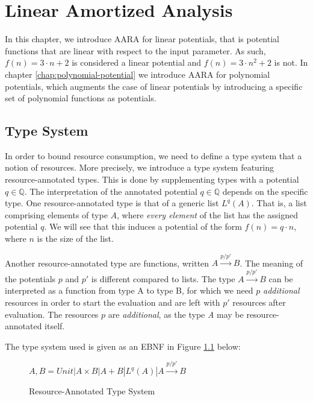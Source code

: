 \chapter{Linear Amortized Analysis} \label{chap:linear}

In this chapter, we introduce AARA for linear potentials, that is potential functions that are linear with respect to the input parameter. As such, \(f(n) = 3 \cdot n + 2\) is considered a linear potential and \(f(n) = 3 \cdot n^{2} + 2\) is not. 
In chapter \ref{chap:polynomial-potential} we introduce AARA for polynomial potentials, which augments the case of linear potentials by introducing a specific set of polynomial functions as potentials.

\section{Type System} \label{chap:type-system}
In order to bound resource consumption, we need to define a type system that a notion of resources. More precisely, we introduce a type system featuring resource-annotated types. This is done by supplementing types with a potential \(q \in \mathbb{Q}\). The interpretation of the annotated potential $ q \in \mathbb{Q} $ depends on the specific type.
One resource-annotated type is that of a generic list \(L^q(A)\). That is, a list comprising elements of type \(A\), where \emph{every element} of the list has the assigned potential \(q\).
We will see that this induces a potential of the form \(f(n) = q \cdot n\), where \(n\) is the size of the list. 

Another resource-annotated type are functions, written \(A \xrightarrow{p/p'} B\). The meaning of the potentials \(p\) and \(p'\) is different compared to lists. The type \(A \xrightarrow{p/p'} B\) can be interpreted as a function from type A to type B, for which we need \(p\) \emph{additional} resources in order to start the evaluation and are left with \(p'\) resources after evaluation. The resources \(p\) are \emph{additional}, as the type \emph{A} may be resource-annotated itself.

The type system used is given as an EBNF in Figure \ref{fig:type-system} below:

\begin{figure}[H]
\centering
\(A,B = Unit | A \times B | A + B | L^q(A) | A \xrightarrow{p/p'} B\)
\caption{Resource-Annotated Type System}
\label{fig:type-system}
\end{figure}

